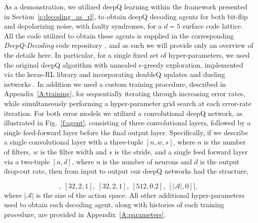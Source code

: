 \documentclass[twocolumn,preprintnumbers,amsmath,amssymb,notitlepage,nofootinbib,longbibliography,superscriptaddress,aps,pra,10pt]{revtex4-1}
\begin{document}
	As a demonstration, we utilized deepQ learning within the framework presented in Section~\ref{s:decoding_as_rl}, to obtain deepQ decoding agents for both bit-flip and depolarizing noise, with faulty syndromes, for a $d=5$ surface code lattice.
	All the code utilized to obtain these agents is supplied in the corresponding \textit{DeepQ-Decoding} code repository \cite{DeepQDecoding}, and as such we will provide only an overview of the details here.
	In particular, for a single fixed set of hyper-parameters, we used the original deepQ algorithm \cite{RLMnih15}with annealed $\epsilon$-greedy exploration, implemented via the keras-RL library \cite{plappert2016kerasrl} and incorporating doubleQ updates \cite{RLvan2016deep} and dueling networks \cite{RLwang2015dueling}.
	In addition we used a custom training procedure, described in Appendix~\ref{A:training}, for sequentially iterating through increasing error rates, while simultaneously performing a hyper-parameter grid search at each error-rate iteration.
	For both error models we utilized a convolutional deepQ network, as illustrated in Fig.~\ref{f:agent}, consisting of three convolutional layers, followed by a single feed-forward layer before the final output layer.
	Specifically, if we describe a single convolutional layer with a three-tuple $[n,w,s]$, where $n$ is the number of filters, $w$ is the filter width and $s$ is the stride, and a single feed forward layer via a two-tuple $[n,d]$, where $n$ is the number of neurons and $d$ is the output drop-out rate, then from input to output our deepQ networks had the structure,


	\begin{equation}
		[[64,3,2],~[32,2,1],~[32,2,1],~[512,0.2],~[|\mathcal{A}|, 0]],
	\end{equation}
	where $|\mathcal{A}|$ is the size of the action space.
	All other additional hyper-parameters used to obtain each decoding agent, along with histories of each training procedure, are provided in Appendix~\ref{A:parameters}.
\end{document}
